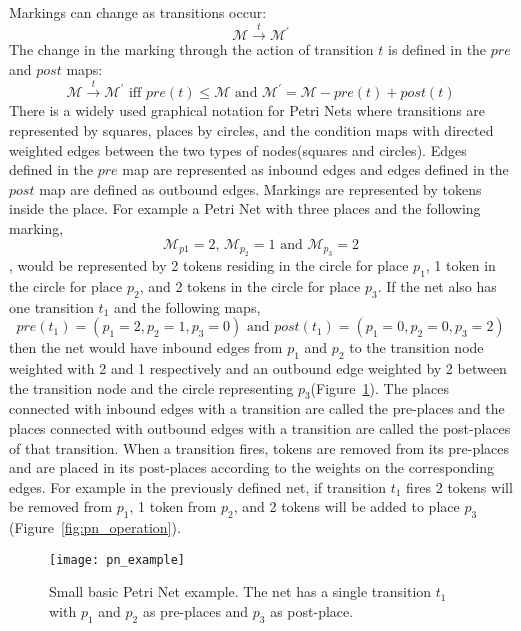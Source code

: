 Markings can change as transitions occur:
\begin{equation*}
\mathcal{M}\overset{t}{\longrightarrow}\mathcal{M^\prime}
\end{equation*}
The change in the marking through the action of transition $t$ is
defined in the $pre$ and $post$ maps:
\begin{equation*}
\mathcal{M}\overset{t}{\longrightarrow}\mathcal{M^\prime} \mbox{ iff } pre(t) \leq \mathcal{M} \mbox{ and } \mathcal{M^\prime} = \mathcal{M} - pre(t) + post(t)
\end{equation*}
There is a widely used graphical notation for Petri Nets where
transitions are represented by squares, places by circles, and the
condition maps with directed weighted edges between the two types of
nodes(squares and circles). Edges defined in the $pre$ map are
represented as inbound edges and edges defined in the $post$ map are
defined as outbound edges. Markings are represented by tokens inside
the place. For example a Petri Net with three places and the following
marking,
\begin{equation*}
\mathcal{M}_{p1} = 2\mbox{, } \mathcal{M}_{p_2}=1 \mbox{ and } \mathcal{M}_{p_3} = 2
\end{equation*}
, would be represented by 2 tokens residing in the circle for place
$p_1$, 1 token in the circle for place $p_2$, and 2 tokens in the
circle for place $p_3$. If the net also has one transition $t_1$ and
the following maps,
\begin{equation*}
pre(t_1) = (p_1 = 2, p_2 = 1, p_3=0) \mbox{ and } post(t_1) = (p_1
=0, p_2=0, p_3=2)
\end{equation*}
then the net would have inbound edges from $p_1$ and $p_2$ to the
transition node weighted with 2 and 1 respectively and an outbound edge
weighted by 2 between the transition node and the circle representing
$p_3$(Figure~\ref{fig:pn_example}). The places connected with
inbound edges with a transition are called the pre-places and the
places connected with outbound edges with a transition are called the
post-places of that transition. When a transition fires, tokens are removed from its
pre-places and are placed in its post-places according to the weights
on the corresponding edges. For example in the previously defined net,
if transition $t_1$ fires 2 tokens will be removed from $p_1$, 1 token
from $p_2$, and 2 tokens will be added to place $p_3$(Figure~\ref{fig:pn_operation}).

\begin{figure}
\centering
\texttt{[image: pn\_example]}
\caption[Small basic Petri Net example]{Small basic Petri Net example. The net has a single
  transition $t_1$ with $p_1$ and $p_2$ as pre-places and $p_3$ as post-place.}
\label{fig:pn_example}
\end{figure}

